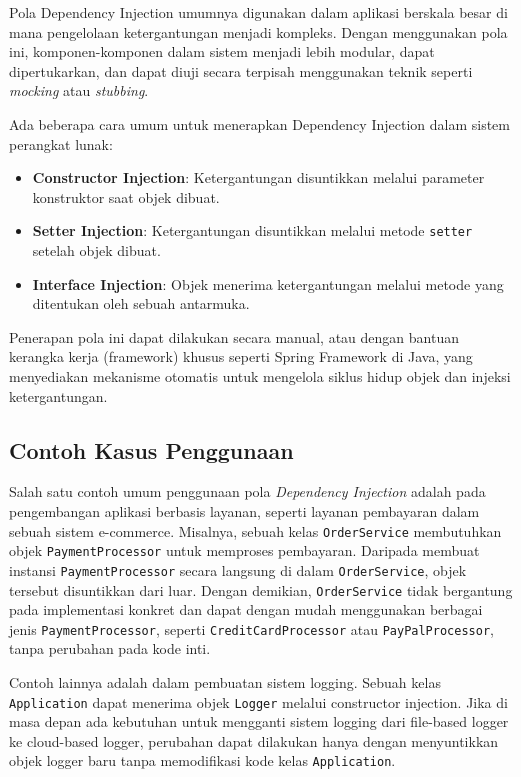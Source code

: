 Pola Dependency Injection umumnya digunakan dalam aplikasi berskala besar di mana pengelolaan ketergantungan menjadi kompleks. Dengan menggunakan pola ini, komponen-komponen dalam sistem menjadi lebih modular, dapat dipertukarkan, dan dapat diuji secara terpisah menggunakan teknik seperti \textit{mocking} atau \textit{stubbing}.

Ada beberapa cara umum untuk menerapkan Dependency Injection dalam sistem perangkat lunak:
\begin{itemize}
\item \textbf{Constructor Injection}: Ketergantungan disuntikkan melalui parameter konstruktor saat objek dibuat.
\item \textbf{Setter Injection}: Ketergantungan disuntikkan melalui metode \texttt{setter} setelah objek dibuat.
\item \textbf{Interface Injection}: Objek menerima ketergantungan melalui metode yang ditentukan oleh sebuah antarmuka.
\end{itemize}

Penerapan pola ini dapat dilakukan secara manual, atau dengan bantuan kerangka kerja (framework) khusus seperti Spring Framework di Java, yang menyediakan mekanisme otomatis untuk mengelola siklus hidup objek dan injeksi ketergantungan.

\subsection{Contoh Kasus Penggunaan}

Salah satu contoh umum penggunaan pola \textit{Dependency Injection} adalah pada pengembangan aplikasi berbasis layanan, seperti layanan pembayaran dalam sebuah sistem e-commerce. Misalnya, sebuah kelas \texttt{OrderService} membutuhkan objek \texttt{PaymentProcessor} untuk memproses pembayaran. Daripada membuat instansi \texttt{PaymentProcessor} secara langsung di dalam \texttt{OrderService}, objek tersebut disuntikkan dari luar. Dengan demikian, \texttt{OrderService} tidak bergantung pada implementasi konkret dan dapat dengan mudah menggunakan berbagai jenis \texttt{PaymentProcessor}, seperti \texttt{CreditCardProcessor} atau \texttt{PayPalProcessor}, tanpa perubahan pada kode inti.

Contoh lainnya adalah dalam pembuatan sistem logging. Sebuah kelas \texttt{Application} dapat menerima objek \texttt{Logger} melalui constructor injection. Jika di masa depan ada kebutuhan untuk mengganti sistem logging dari file-based logger ke cloud-based logger, perubahan dapat dilakukan hanya dengan menyuntikkan objek logger baru tanpa memodifikasi kode kelas \texttt{Application}.

